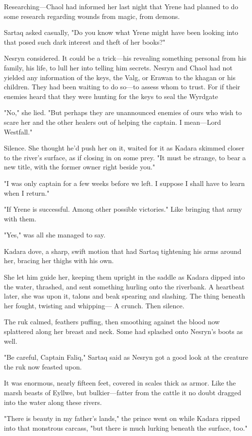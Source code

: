 Researching---Chaol had informed her last night that Yrene had planned to do some research regarding wounds from magic, from demons.

Sartaq asked casually, "Do you know what Yrene might have been looking into that posed such dark interest and theft of her books?"

Nesryn considered. It could be a trick---his revealing something personal from his family, his life, to lull her into telling him secrets. Nesryn and Chaol had not yielded any information of the keys, the Valg, or Erawan to the khagan or his children. They had been waiting to do so---to assess whom to trust. For if their enemies heard that they were hunting for the keys to seal the Wyrdgate 

"No," she lied. "But perhaps they are unannounced enemies of ours who wish to scare her and the other healers out of helping the captain. I mean---Lord Westfall."

Silence. She thought he'd push her on it, waited for it as Kadara skimmed closer to the river's surface, as if closing in on some prey. "It must be strange, to bear a new title, with the former owner right beside you."

"I was only captain for a few weeks before we left. I suppose I shall have to learn when I return."

"If Yrene is successful. Among other possible victories." Like bringing that army with them.

"Yes," was all she managed to say.

Kadara dove, a sharp, swift motion that had Sartaq tightening his arms around her, bracing her thighs with his own.

She let him guide her, keeping them upright in the saddle as Kadara dipped into the water, thrashed, and sent something hurling onto the riverbank. A heartbeat later, she was upon it, talons and beak spearing and slashing. The thing beneath her fought, twisting and whipping--- A crunch. Then silence.

The ruk calmed, feathers puffing, then smoothing against the blood now splattered along her breast and neck. Some had splashed onto Nesryn's boots as well.

"Be careful, Captain Faliq," Sartaq said as Nesryn got a good look at the creature the ruk now feasted upon.

It was enormous, nearly fifteen feet, covered in scales thick as armor. Like the marsh beasts of Eyllwe, but bulkier---fatter from the cattle it no doubt dragged into the water along these rivers.

"There is beauty in my father's lands," the prince went on while Kadara ripped into that monstrous carcass, "but there is much lurking beneath the surface, too."

